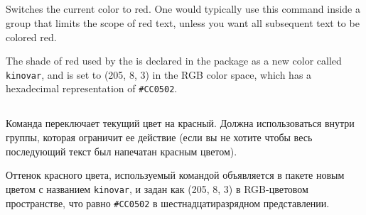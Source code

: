 \begin{EN}

\subsection{}
Switches the current color to red. One would typically use this command
inside a group that limits the scope of red text, unless
you want all subsequent text to be colored red.

 The shade of red used by the  is declared in the package as a new color called \verb+kinovar+, and is set to (205, 8, 3) in the RGB color space, which has a hexadecimal representation of \verb+#CC0502+.
\end{EN}

\begin{RU}

\subsection{}
Команда переключает текущий цвет на красный. Должна использоваться
внутри группы, которая ограничит ее действие (если вы не хотите
чтобы весь последующий текст был напечатан красным цветом).

 Оттенок красного цвета, используемый командой  объявляется в пакете новым цветом с названием \verb+kinovar+, и задан как (205, 8, 3) в RGB-цветовом пространстве, что равно \verb+#CC0502+ в шестнадцатиразрядном представлении.
\end{RU}

